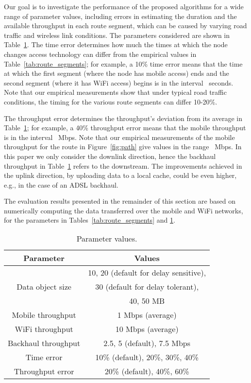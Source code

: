\documentclass{sig-alternate}
\begin{document}
Our goal is to investigate the performance of the proposed algorithms for a wide range of parameter values, including  errors in estimating the duration and the available throughput in each route segment, which can be caused by varying road traffic and wireless link conditions. The parameters  considered  are shown in Table~\ref{tab:values}.
The time error determines how much the times at which the node changes access technology can differ from the empirical values  in  Table~\ref{tab:route_segments}; for example, a 10\% time error means that the time at which the first segment (where the node has mobile access) ends and the  second segment (where it has  WiFi access) begins is in the interval ~seconds. Note that our empirical measurements show that under typical road traffic conditions, the timing for the various route segments can differ 10-20\%.

The throughput error determines the throughput's deviation from its average    in Table~\ref{tab:values}; for example, a 40\% throughput error means that the mobile throughput is in the interval ~Mbps. Note that our empirical measurements of the mobile throughput for the route in Figure~\ref{fig:path} give values in the range ~Mbps.
In this paper we only consider the downlink direction, hence the backhaul throughput in Table~\ref{tab:values} refers to the downstream. The improvements achieved in the uplink direction, by uploading data to a local cache,  could be even higher, e.g., in the case of an ADSL backhaul.

The evaluation results presented in the remainder of this section are based on numerically computing the data transferred over the mobile and WiFi networks, for the parameters  in Tables~\ref{tab:route_segments} and \ref{tab:values}.



\begin{table}[tb]
\caption{Parameter values.}
    \label{tab:values}
\centering
 {\small \begin{tabular}{|c|c|}
        \hline
        Parameter  &  Values\\
        \hline \hline
         & 10, 20 (default for delay sensitive), \\
   Data object size      & 30 (default for delay tolerant), \\
         & 40, 50 MB \\
    Mobile throughput  & 1 Mbps (average)\\
    WiFi throughput & 10 Mbps (average)\\
    Backhaul throughput & 2.5, 5 (default), 7.5 Mbps \\
    Time error & 10\% (default), 20\%, 30\%, 40\%  \\
    Throughput error & 20\% (default), 40\%, 60\% \\
        \hline
        \end{tabular}
        }
\end{table}
\end{document}
